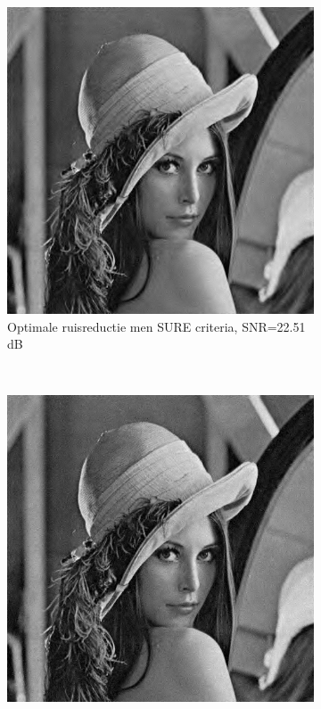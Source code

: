 \begin{figure}
    \centering
    \begin{subfigure}[b]{0.4\textwidth}
        \includegraphics[width=\textwidth]{../src/denoising/sure/SURE_SNR}
        \caption{Optimale ruisreductie men SURE criteria, SNR=22.51 dB }
        \label{fig:roster_denoising}
    \end{subfigure}
    ~ %
    \begin{subfigure}[b]{0.4\textwidth}
        \includegraphics[width=\textwidth]{../src/denoising/sure/SURE_SURE}

\end{subfigure}
\end{figure}
